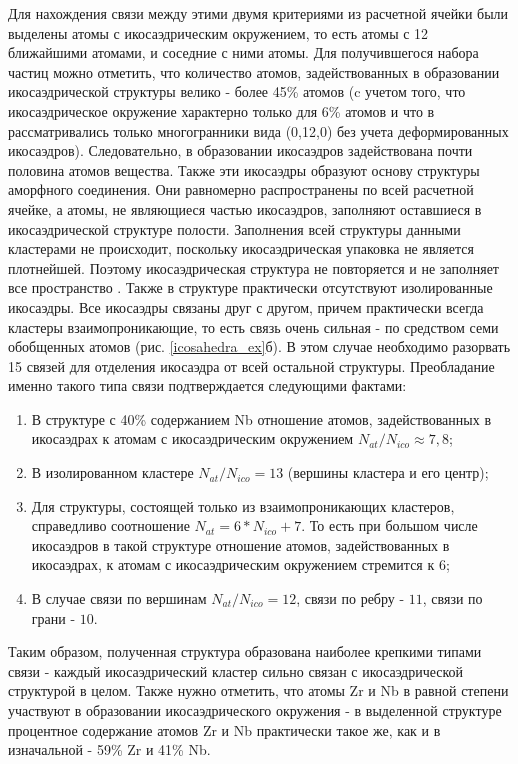 Для нахождения связи между этими двумя критериями из расчетной ячейки были выделены атомы с икосаэдрическим окружением, то есть атомы с 12 ближайшими атомами,  и соседние с ними атомы. Для получившегося набора частиц можно отметить, что количество атомов, задействованных в образовании икосаэдрической структуры велико - более 45\% атомов (c учетом того, что икосаэдрическое окружение характерно только для 6\% атомов и что в рассматривались только многогранники вида (0,12,0) без 
учета деформированных икосаэдров). Следовательно, в образовании икосаэдров задействована почти половина атомов вещества. Также  эти икосаэдры образуют основу структуры аморфного соединения. Они равномерно распространены по всей расчетной ячейке, а атомы, не являющиеся частью икосаэдров, заполняют оставшиеся в икосаэдрической структуре полости. Заполнения всей структуры данными кластерами не происходит, поскольку икосаэдрическая упаковка не является плотнейшей. Поэтому икосаэдрическая структура не повторяется  и не заполняет все пространство \cite{Hoare}. Также в структуре  практически отсутствуют изолированные икосаэдры. Все икосаэдры связаны друг с другом, причем практически всегда кластеры взаимопроникающие, то есть связь очень сильная - по средством семи обобщенных атомов (рис. \ref{icosahedra_ex}б). В этом случае необходимо разорвать 15 связей для отделения икосаэдра от всей остальной  структуры. Преобладание именно такого типа связи подтверждается следующими фактами:
\begin{enumerate}
	\item В структуре с 40\%  содержанием Nb отношение атомов, задействованных в икосаэдрах к атомам с икосаэдрическим окружением  $N_{at}/N_{ico}\approx 7,8$;
	\item В изолированном кластере $N_{at}/N_{ico}=13$  (вершины кластера и его центр);
	\item Для структуры, состоящей только из взаимопроникающих кластеров, справедливо соотношение $N_{at} = 6*N_{ico}+7$. То есть при большом числе икосаэдров в такой структуре отношение атомов,  задействованных в икосаэдрах, к атомам с икосаэдрическим окружением стремится к 6;
	\item В случае связи по вершинам  $N_{at}/N_{ico}=12$, связи по ребру - $11$, связи по грани - $10$. 
\end{enumerate}

Таким образом, полученная  структура образована наиболее крепкими типами связи - каждый  икосаэдрический кластер сильно связан с икосаэдрической структурой в целом. Также нужно отметить, что атомы Zr и Nb  в равной степени участвуют в образовании икосаэдрического окружения - в выделенной структуре процентное содержание атомов  Zr и Nb практически такое же, как и в изначальной - 59\% Zr и 41\% Nb.

